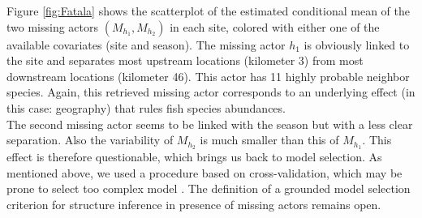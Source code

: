 %
Figure \ref{fig:Fatala} shows the scatterplot of the estimated conditional mean of the two missing actors $(M_{h_1}, M_{h_2})$ in each site, colored with either one of the available covariates (site and season). The missing actor $h_1$ is obviously linked to the site and separates most upstream locations (kilometer 3) from most downstream locations (kilometer 46). This actor has 11 highly probable neighbor species.
Again, this retrieved missing actor corresponds to an underlying effect (in this case: geography) that rules fish species abundances. \\
% 
The second missing actor seems to be linked with the season but with a less clear separation. Also the variability of $M_{h_2}$ is much smaller than this of $M_{h_1}$. This effect is therefore questionable, which brings us back to model selection. As mentioned above, we used a procedure based on cross-validation, which may  be prone to select too complex model \citep{shao1993linear,friedman2001elements,arlot2010survey}. The definition of a grounded model selection criterion for structure inference in presence of missing actors remains open.

 
